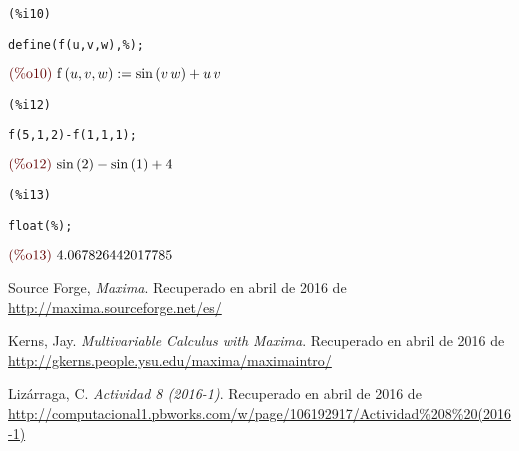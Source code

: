 \documentclass[12pt]{article}
\begin{document}
\noindent
\begin{minipage}[t]{8ex}{\color{red}\bf
\begin{verbatim}
(%i10) 
\end{verbatim}}
\end{minipage}
\begin{minipage}[t]{\textwidth}{\color{blue}
\begin{verbatim}
define(f(u,v,w),%);
\end{verbatim}}
\end{minipage}
\begin{math}\displaystyle
\parbox{8ex}{\color{labelcolor}(\%o10) }
\mathrm{f}\left( u,v,w\right) :=\mathrm{sin}\left( v\,w\right) +u\,v
\end{math}


\noindent
\begin{minipage}[t]{8ex}{\color{red}\bf
\begin{verbatim}
(%i12) 
\end{verbatim}}
\end{minipage}
\begin{minipage}[t]{\textwidth}{\color{blue}
\begin{verbatim}
f(5,1,2)-f(1,1,1);
\end{verbatim}}
\end{minipage}
\begin{math}\displaystyle
\parbox{8ex}{\color{labelcolor}(\%o12) }
\mathrm{sin}\left( 2\right) -\mathrm{sin}\left( 1\right) +4
\end{math}


\noindent
\begin{minipage}[t]{8ex}{\color{red}\bf
\begin{verbatim}
(%i13) 
\end{verbatim}}
\end{minipage}
\begin{minipage}[t]{\textwidth}{\color{blue}
\begin{verbatim}
float(%);
\end{verbatim}}
\end{minipage}
\begin{math}\displaystyle
\parbox{8ex}{\color{labelcolor}(\%o13) }
4.067826442017785
\end{math}

\begin{thebibliography}{6}

Source Forge,
\emph{Maxima}. Recuperado en abril de 2016 de \url{http://maxima.sourceforge.net/es/}

Kerns, Jay.
\emph{Multivariable Calculus with Maxima}. Recuperado en abril de 2016 de \url{http://gkerns.people.ysu.edu/maxima/maximaintro/}

Lizárraga, C.
\emph{Actividad 8 (2016-1)}. Recuperado en abril de 2016 de \url{http://computacional1.pbworks.com/w/page/106192917/Actividad\%208\%20(2016-1)}

\end{thebibliography}
\end{document}
